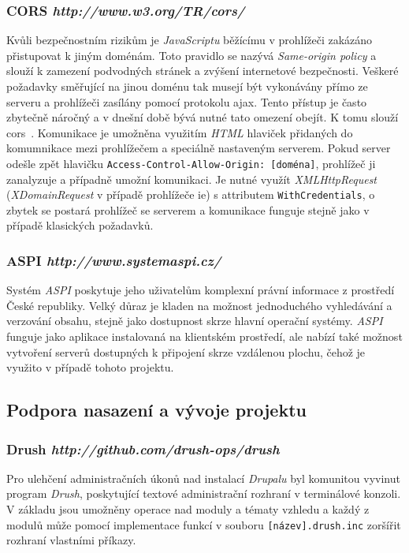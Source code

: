 \subsubsection*{\textbf{CORS} \hfill \emph{http://www.w3.org/TR/cors/}} 
Kvůli bezpečnostním rizikům je \emph{JavaScriptu} běžícímu v prohlížeči zakázáno přistupovat k jiným doménám. Toto pravidlo se nazývá \emph{Same-origin policy} a slouží k zamezení podvodných stránek a zvýšení internetové bezpečnosti. Veškeré požadavky směřující na jinou doménu tak musejí být vykonávány přímo ze serveru a prohlížeči zasílány pomocí protokolu \gls{ajax}. Tento přístup je často zbytečně náročný a v dnešní době bývá nutné tato omezení obejít. K tomu slouží \gls{cors}~\cite{website:cors}. Komunikace je umožněna využitím \emph{HTML} hlaviček přidaných do komumnikace mezi prohlížečem a speciálně nastaveným serverem. Pokud server odešle zpět hlavičku \texttt{Access-Control-Allow-Origin: [doména]}, prohlížeč ji zanalyzuje a případně umožní komunikaci. Je nutné využít \emph{XMLHttpRequest} (\emph{XDomainRequest} v případě prohlížeče \gls{ie}) s attributem \texttt{WithCredentials}, o zbytek se postará prohlížeč se serverem a komunikace funguje stejně jako v případě klasických požadavků.

\subsubsection*{\textbf{ASPI} \hfill \emph{http://www.systemaspi.cz/}}
Systém \emph{ASPI} poskytuje jeho uživatelům komplexní právní informace z prostředí České republiky. Velký důraz je kladen na možnost jednoduchého vyhledávání a verzování obsahu, stejně jako dostupnost skrze hlavní operační systémy. \emph{ASPI} funguje jako aplikace instalovaná na klientském prostředí, ale nabízí také možnost vytvoření serverů dostupných k připojení skrze vzdálenou plochu, čehož je využito v případě tohoto projektu.

\subsection{Podpora nasazení a vývoje projektu}

\subsubsection*{\textbf{Drush} \hfill \emph{http://github.com/drush-ops/drush}}
\label{subsec:drush}
Pro ulehčení administračních úkonů nad instalací \emph{Drupalu} byl komunitou vyvinut program \emph{Drush}, poskytující textové administrační rozhraní v terminálové konzoli. V základu jsou umožněny operace nad moduly a tématy vzhledu a každý z modulů může pomocí implementace funkcí v souboru \texttt{[název].drush.inc} zoršířit rozhraní vlastními příkazy.

